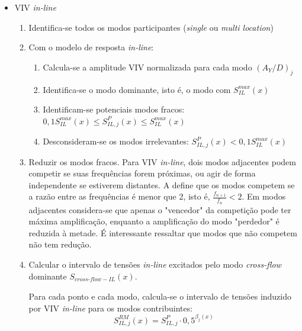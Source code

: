\begin{itemize}
\begin{enumerate}
\end{enumerate}

\item VIV \textit{in-line}

\begin{enumerate}
    \item Identifica-se todos os modos participantes (\textit{single} ou \textit{multi location})
    
    \item Com o modelo de resposta \textit{in-line}:
    
    \begin{enumerate}
    	\item Calcula-se a amplitude VIV normalizada para cada modo $(A_Y/D)_j$
    
    	\item Identifica-se o modo dominante, isto é, o modo com $S_\mathit{IL}^\mathit{max}(x)$
    
    	\item Identificam-se potenciais modos fracos: $0,1 S_\mathit{IL}^\mathit{max}(x) \leq S_{\mathit{IL}, \mathit{j}}^{P}(x) \leq S_\mathit{IL}^\mathit{max}(x)$
    
    	\item Desconsideram-se os modos irrelevantes: $S_{\mathit{IL}, \mathit{j}}^{P}(x) < 0,1 S_\mathit{IL}^\mathit{max}(x)$
    \end{enumerate}

        \item Reduzir os modos fracos.
        Para VIV \textit{in-line}, dois modos adjacentes podem competir se suas frequências forem próximas, ou agir de forma independente se estiverem distantes.
        A  define que os modos competem se a razão entre as frequências é menor que 2, isto é, $\frac{f_\mathit{n+1}}{f_n} < 2$.
        Em modos adjacentes considera-se que apenas o "vencedor" da competição pode ter máxima amplificação, enquanto a amplificação do modo "perdedor" é reduzida à metade. É interessante ressaltar que modos que não competem não tem redução.
    
        \item Calcular o intervalo de tensões \textit{in-line} excitados pelo modo \textit{cross-flow} dominante $S_{\mathit{\textit{cross-flow}}-\mathit{IL}}(x)$.
    
        Para cada ponto e cada modo, calcula-se o intervalo de tensões induzido por VIV \textit{in-line} para os modos contribuintes:
        		\[S_{\mathit{IL}, \mathit{j}}^\mathit{RM}(x) = S_{\mathit{IL}, \mathit{j}}^{P} \cdot 0,5^{\beta_j (x)}\]
        

\end{enumerate}
\end{itemize}
